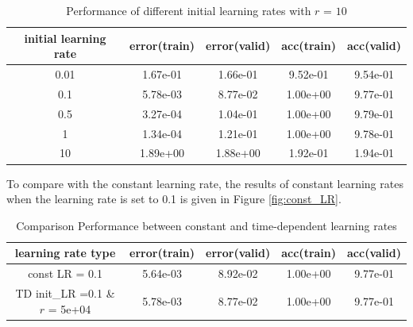 \documentclass[11pt]{article}
\begin{document}
\begin{table}
\begin{center}
\begin{tabular}{ c c c c c} 
\hline
initial learning rate & error(train) & error(valid) & acc(train) & acc(valid)\\
\hline
\hline
0.01& 1.67e-01 & 1.66e-01 & 9.52e-01 & 9.54e-01 \\ 
0.1 & 5.78e-03 & 8.77e-02 & 1.00e+00 & 9.77e-01 \\ 
0.5 & 3.27e-04 & 1.04e-01 & 1.00e+00 & 9.79e-01 \\ 
1  &  1.34e-04  & 1.21e-01 & 1.00e+00 & 9.78e-01 \\
10 &  1.89e+00 & 1.88e+00 & 1.92e-01 & 1.94e-01  \\
\end{tabular}
\caption{Performance of different initial learning rates with $r$ = $10$}
\label{tb:init_lr}
\end{center}	
\end{table}

To compare with the constant learning rate, the results of constant learning rates when the learning rate is set to 0.1 is given in Figure \ref{fig:const_LR}. 

\begin{table}
\begin{center}
\begin{tabular}{ c c c c c} 
\hline
 learning rate type & error(train) & error(valid) & acc(train) & acc(valid)\\
\hline
\hline
const LR = 0.1 & 5.64e-03 & 8.92e-02 &1.00e+00 &9.77e-01\\
TD init\_LR =0.1 \& $r$ = 5e+04 & 5.78e-03 & 8.77e-02 & 1.00e+00 & 9.77e-01 \\ 
\end{tabular}
\caption{Comparison Performance between constant and time-dependent learning rates}
\label{tb:compare_const_td_lr}
\end{center}	
\end{table}
\end{document}
